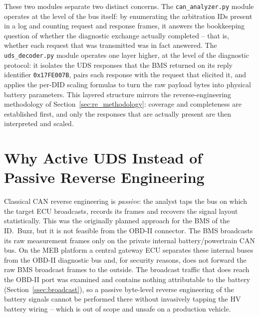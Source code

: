 \documentclass[11pt,a4paper,oneside,parskip=half]{scrreprt}
\providecommand{\hex}{}\renewcommand{\hex}[1]{\texttt{0x#1}}
\begin{document}
These two modules separate two distinct concerns. The \texttt{can\_analyzer.py} module operates at the level of the bus itself: by enumerating the arbitration IDs present in a log and counting request and response frames, it answers the bookkeeping question of whether the diagnostic exchange actually completed -- that is, whether each request that was transmitted was in fact answered. The \texttt{uds\_decoder.py} module operates one layer higher, at the level of the diagnostic protocol: it isolates the UDS responses that the BMS returned on its reply identifier \hex{17FE007B}, pairs each response with the request that elicited it, and applies the per-DID scaling formulas to turn the raw payload bytes into physical battery parameters. This layered structure mirrors the reverse-engineering methodology of Section~\ref{sec:re_methodology}: coverage and completeness are established first, and only the responses that are actually present are then interpreted and scaled.

\section{Why Active UDS Instead of Passive Reverse Engineering}
\label{sec:why_uds}
Classical CAN reverse engineering is \textit{passive}: the analyst taps the bus on which the target ECU broadcasts, records its frames and recovers the signal layout statistically. This was the originally planned approach for the BMS of the ID.~Buzz, but it is not feasible from the OBD-II connector. The BMS broadcasts its raw measurement frames only on the private internal battery/powertrain CAN bus. On the MEB platform a central gateway ECU separates these internal buses from the OBD-II diagnostic bus and, for security reasons, does not forward the raw BMS broadcast frames to the outside. The broadcast traffic that does reach the OBD-II port was examined and contains nothing attributable to the battery (Section~\ref{ssec:broadcast}), so a passive byte-level reverse engineering of the battery signals cannot be performed there without invasively tapping the HV battery wiring -- which is out of scope and unsafe on a production vehicle.
\end{document}

